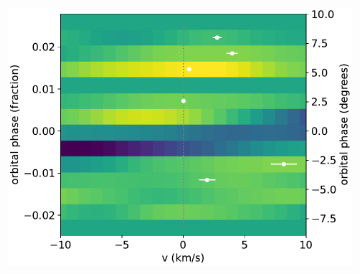 \documentclass[twocolumn]{aastex631}
\begin{document}
\begin{figure}[ht!]
\begin{subfigure}[b]{0.333\textwidth}
            \label{fig:1d-ccf-Fe-combined}
        \end{subfigure}
        \begin{subfigure}[b]{0.333\textwidth}
            \includegraphics[width=\textwidth]{plots-updated/line-velocity/binned/pcolor/points/KELT-20b.Fe.phase-binned+RVs.pdf}
            \label{fig:wind-chars-Fe-combined}
        \end{subfigure}


\end{figure}
\end{document}
